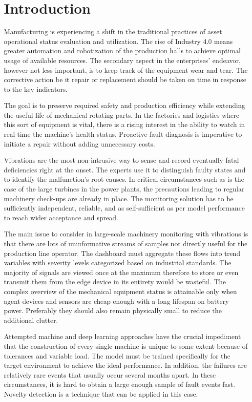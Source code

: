 \chapter{Introduction}
Manufacturing is experiencing a shift in the traditional practices of asset operational status evaluation and utilization. The rise of Industry 4.0 means greater automation and robotization of the production halls to achieve optimal usage of available resources. The secondary aspect in the enterprises' endeavor, however not less important, is to keep track of the equipment wear and tear. The corrective action be it repair or replacement should be taken on time in response to the key indicators. 

The goal is to preserve required safety and production efficiency while extending the useful life of mechanical rotating parts. In the factories and logistics where this sort of equipment is vital, there is a rising interest in the ability to watch in real time the machine's health status. Proactive fault diagnosis is imperative to initiate a repair without adding unnecessary costs. 

Vibrations are the most non-intrusive way to sense and record eventually fatal deficiencies right at the onset. The experts use it to distinguish faulty states and to identify the malfunction's root causes. In critical circumstances such as is the case of the large turbines in the power plants, the precautions leading to regular machinery check-ups are already in place. The monitoring solution has to be sufficiently independent, reliable, and as self-sufficient as per model performance to reach wider acceptance and spread.

The main issue to consider in large-scale machinery monitoring with vibrations is that there are lots of uninformative streams of samples not directly useful for the production line operator. The dashboard must aggregate these flows into trend variables with severity levels categorized based on industrial standards. The majority of signals are viewed once at the maximum therefore to store or even transmit them from the edge device in its entirety would be wasteful. The complex overview of the mechanical equipment status is attainable only when agent devices and sensors are cheap enough with a long lifespan on battery power. Preferably they should also remain physically small to reduce the additional clutter.

Attempted machine and deep learning approaches have the crucial impediment that the construction of every single machine is unique to some extent because of tolerances and variable load. The model must be trained specifically for the target environment to achieve the ideal performance. In addition, the failures are relatively rare events that usually occur several months apart. In these circumstances, it is hard to obtain a large enough sample of fault events fast. Novelty detection is a technique that can be applied in this case.

